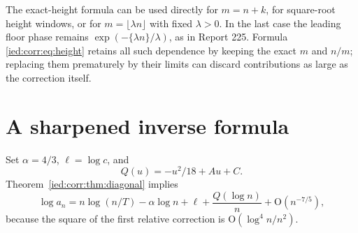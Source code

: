 \documentclass[11pt,letterpaper]{article}
\theoremstyle{remark}\newtheorem{remark}[theorem]{Remark}
\newcommand{\Oh}{\mathrm O}\newcommand{\supp}{\operatorname{supp}}
\begin{document}
The exact-height formula can be used directly for $m=n+k$, for square-root height windows, or for $m=\lfloor\lambda n\rfloor$ with fixed $\lambda>0$. In the last case the leading floor phase remains $\exp(-\{\lambda n\}/\lambda)$, as in Report 225. Formula \eqref{ied:corr:eq:height} retains all such dependence by keeping the exact $m$ and $n/m$; replacing them prematurely by their limits can discard contributions as large as the correction itself.

\section{A sharpened inverse formula}\label{ied:corr:sec:inverse}
Set $\alpha=4/3$, $\ell=\log c$, and
\[
 Q(u)=-u^2/18+Au+C.
\]
Theorem~\ref{ied:corr:thm:diagonal} implies
\begin{equation}\label{ied:corr:eq:logmodel}
 \log a_n=n\log(n/T)-\alpha\log n+\ell
               +\frac{Q(\log n)}n+\Oh(n^{-7/5}),
\end{equation}
because the square of the first relative correction is $\Oh(\log^4n/n^2)$.
\end{document}
